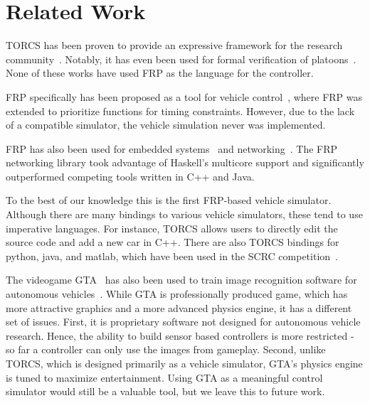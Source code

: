 \section{Related Work}

TORCS has been proven to provide an expressive framework for the research community~\cite{OnievaPAMP09,conf/cig/CardamoneLL09,conf/cig/MunozGS10}. 
Notably, it has even been used for formal verification of platoons~\cite{kamali2016formal,xu2016experimental}. 
None of these works have used FRP as the language for the controller.


FRP specifically has been proposed as a tool for vehicle control~\cite{kazemi2016,zou2016}, where FRP was extended to prioritize functions for timing constraints. However, due to the lack of a compatible simulator, the vehicle simulation never was implemented. 

FRP has also been used for embedded systems~\cite{helbling2016juniper} and networking~\cite{voellmy2012scalable}.
The FRP networking library took advantage of Haskell's multicore support and significantly outperformed competing tools written in C++ and Java.


To the best of our knowledge this is the first FRP-based vehicle simulator.
Although there are many bindings to various vehicle simulators, these tend to use imperative languages.
For instance, TORCS allows users to directly edit the source code and add a new car in C++.
There are also TORCS bindings for python, java, and matlab, which have been used in the SCRC competition~\cite{SCRC}.

The videogame GTA~\cite{gtaV} has also been used to train image recognition software for autonomous vehicles~\cite{gtaPrinceton}.
While GTA is professionally produced game, which has more attractive graphics and a more advanced physics engine, it has a different set of issues.
First, it is proprietary software not designed for autonomous vehicle research. 
Hence, the ability to build sensor based controllers is more restricted - so far a controller can only use the images from gameplay. 
Second, unlike TORCS, which is designed primarily as a vehicle simulator, GTA's physics engine is tuned to maximize entertainment.
Using GTA as a meaningful control simulator would still be a valuable tool, but we leave this to future work.
